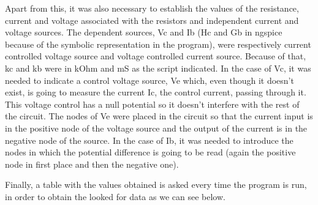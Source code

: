 \par Apart from this, it was also necessary to establish the values of the resistance, current and voltage associated with the resistors and independent current and voltage sources. The dependent sources, Vc and Ib (Hc and Gb in ngspice because of the symbolic representation in the program), were respectively current controlled voltage source and voltage controlled current source. Because of that, kc and kb were in kOhm and mS as the script indicated. In the case of Vc, it was needed to indicate a control voltage source, Ve which, even though it doesn't exist, is going to measure the current Ic, the control current, passing through it. This voltage control has a null potential so it doesn't interfere with the rest of the circuit. The nodes of Ve were placed in the circuit so that the current input is in the positive node of the voltage source and the output of the current is in the negative node of the source.  In the case of Ib, it was needed to introduce the nodes in which the potential difference is going to be read (again the positive node in first place and then the negative one).

\par \noindent Finally, a table with the values obtained is asked every time the program is run, in order to obtain the looked for data as we can see below. 
\vspace{5mm}
\begin{table}[ht]
\centering
\begin{tabularx}{0.8\textwidth} {
  | >{\raggedright\arraybackslash}X
  | >{\raggedleft\arraybackslash}X | }
 \hline

\end{tabularx}
\end{table}




